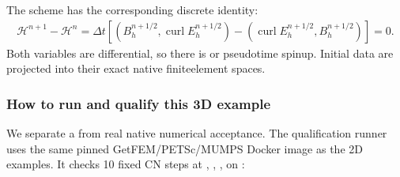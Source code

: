 \documentclass[letterpaper,10pt,english]{sphinxmanual}
\begin{document}
\begin{sphinxVerbatim}[commandchars=\\\{\}]
  \PYG{p}{[}\PYG{p}{]}
  \PYG{p}{[}\PYG{p}{]}
 


\end{sphinxVerbatim}

\sphinxAtStartPar
The  scheme has
the corresponding 
discrete identity:
\begin{equation*}
\begin{split}\mathcal H^{n+1}-\mathcal H^n
 =\Delta t\left[
   (B_h^{n+1/2},\operatorname{curl}E_h^{n+1/2})
  -(\operatorname{curl}E_h^{n+1/2},B_h^{n+1/2})
  \right]=0.\end{split}
\end{equation*}
\sphinxAtStartPar
Both variables are differential, so
there is  or pseudo\sphinxhyphen{}time spin\sphinxhyphen{}up.
Initial data are projected into their
exact native finite\sphinxhyphen{}element spaces.


\subsubsection{How to run and qualify this 3D example}
\label{\detokenize{examples/maxwell_3d:how-to-run-and-qualify-this-3d-example}}
\sphinxAtStartPar
We separate a  from
real native numerical acceptance.
The qualification runner uses the same
pinned GetFEM/PETSc/MUMPS Docker image
as the 2D examples. It checks
10 fixed CN steps at ,
, ,
on :
\end{document}
